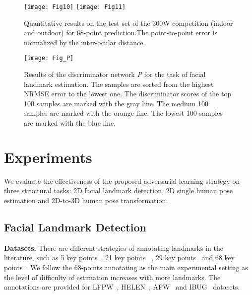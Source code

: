 \documentclass[10pt,journal,compsoc]{IEEEtran}
\begin{document}
\begin{figure*}[!t]
\centering
\texttt{[image: Fig10]}
\hspace{1em}
\texttt{[image: Fig11]}
%
\caption{Quantitative results on the test set of the 300W competition (indoor and outdoor) for 68-point prediction.The point-to-point error is normalized by the inter-ocular distance.}
\label{fig:CED}
\end{figure*}

\begin{figure}[!t]
\centering
\texttt{[image: Fig\_P]}
\caption{Results of the discriminator network \textit{P} for the task of facial landmark estimation. The samples are sorted from the highest NRMSE error to the lowest one. The discriminator scores of the top 100 samples are marked with the gray line. The medium 100 samples are marked with the orange line. The lowest 100 samples are marked with the blue line.}
\label{fig:Fig_P}
\end{figure}




\section{Experiments}\label{sec:Experiments}


We evaluate the effectiveness of the proposed adversarial learning strategy on three structural tasks: 2D facial landmark detection, 2D single human pose estimation and 2D-to-3D human pose transformation.

\subsection{Facial Landmark Detection}\label{subsec:exp_face}
\noindent \textbf{Datasets.}
There are different strategies of annotating landmarks in the literature, such as 5 key points~\cite{sun2013deep}, 21 key points ~\cite{koestinger11a}, 29 key points~\cite{belhumeur2013localizing} and 68 key points~\cite{sagonas2013300}.
We follow the 68-points annotating as the main experimental setting as the level of difficulty of estimation increases with more landmarks.
The annotations are provided for LFPW~\cite{belhumeur2013localizing}, HELEN~\cite{le2012interactive}, AFW~\cite{zhu2012face} and IBUG~\cite{sagonas2013300} datasets.
\end{document}
